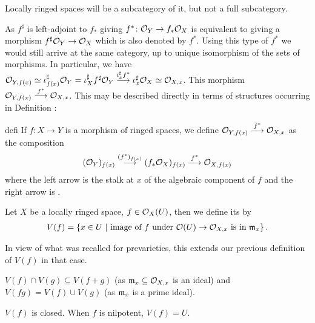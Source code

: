 \documentclass[a4paper,parskip=half,numbers=enddot, DIV=12]{scrreprt}
\begin{document}
\begin{rem*}
    Locally ringed spaces will be a subcategory of it, but not a full subcategory.
\end{rem*}
\begin{rem*}
    As $f^\sharp$ is left-adjoint to $f_*$ giving $f^*\colon \mathcal{O}_Y\to f_*\mathcal{O}_X$ is equivalent to giving a morphism $f^\sharp \mathcal{O}_Y \to \mathcal{O}_X$ which is also denoted by $f^*$. Using this type of $f^*$ we would still arrive at the same category, up to unique isomorphism of the sets of morphisms. In particular, we have $\Oo_{Y,f(x)} \simeq \iota_{f(x)}^\sharp \Oo_Y = \iota_{X}^\sharp f^\sharp \Oo_Y  \morphism[i^\sharp_xf^*] \iota^\sharp_{x} \Oo_X \simeq \Oo_{X,x}$. This morphism $\Oo_{Y,f(x)} \morphism[f^*] \Oo_{X,x}$. This may be described directly in terms of structures occurring in Definition :
\end{rem*}
\begin{varthm}{defi}
    If $f\colon X\to Y$ is a morphism of ringed spaces, we define $\Oo_{Y,f(x)} \morphism[f^*]\Oo_{X,x}$ as the composition
    \begin{align*}
        (\Oo_Y)_{f(x)} \morphism[(f^*)_{f(x)}] (f_*\Oo_X)_{f(x)}\morphism[f^*] \Oo_{X,f(x)}
    \end{align*}
    where the left arrow is the stalk at $x$ of the algebraic component of $f$ and the right arrow is .
\end{varthm}
\begin{defi}
    Let $X$ be a locally ringed space, $f\in \mathcal{O}_X(U)$, then we define its  by 
    \begin{align*}
        V(f) = \left\{x\in U\ \middle|\  \text{image of } f \text{ under } \mathcal{O}(U) \to \mathcal{O}_{X,x} \text{ is in } \mathfrak{m}_x\right\}.
    \end{align*}
\end{defi}
\begin{rem*}
    \begin{alphanumerate}
      \item 
        In view of what was recalled for prevarieties, this extends our previous definition of $V(f)$ in that case.
      \item 
        $V(f)\cap V(g) \subseteq V(f+g)$ (as $\mathfrak{m}_x\subseteq \mathcal{O}_{X,x}$ is an ideal) and $V(fg)= V(f) \cup V(g)$ (as $\mathfrak{m}_x$ is a prime ideal). 
    \end{alphanumerate}
\end{rem*}
\begin{fact}
    $V(f)$ is closed. When $f$ is nilpotent, $V(f) = U$.
\end{fact}
\end{document}
